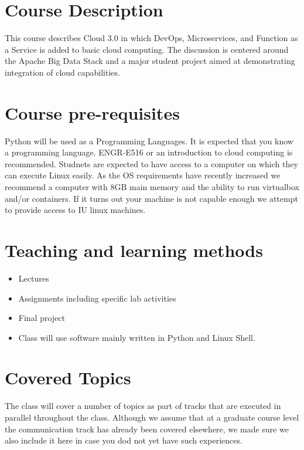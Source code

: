 \TODAY

\section{Course Description }

This course describes Cloud 3.0 in which DevOps, Microservices, and
Function as a Service is added to basic cloud computing. The
discussion is centered around the Apache Big Data Stack and a major
student project aimed at demonstrating integration of cloud
capabilities.

\section{Course pre-requisites}

Python will be used as a Programming Languages. It is expected that
you know a programming language. ENGR-E516 or an introduction to cloud
computing is recommended. Studnets are expected to have access to a
computer on which they can execute Linux easily. As the OS
requirements have recently increased we recommend a computer with 8GB
main memory and the ability to run virtualbox and/or containers. If it
turns out your machine is not capable enough we attempt to provide
access to IU linux machines.

\section{Teaching and learning methods}

\begin{itemize}
\item	Lectures
\item	Assignments including specific lab activities
\item	Final project
\item Class will use software mainly written in Python
  and Linux Shell.
\end{itemize}



\section{Covered Topics}

The class will cover a number of topics as part of tracks that are
executed in parallel throughout the class. Although we assume that at
a graduate course level the communication track has already been
covered elsewhere, we made sure we also include it here in case you dod
not yet have such experiences.

